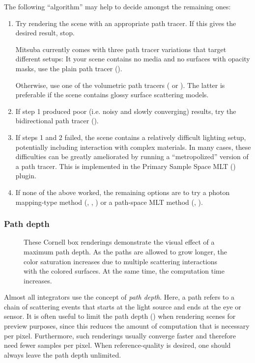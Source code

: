 The following ``algorithm'' may help to decide amongst the remaining ones:
\begin{enumerate}
\item Try rendering the scene with an appropriate path tracer. If this gives the desired result, stop.

Mitsuba currently comes with three path tracer variations that target different setups: It your
scene contains no media and no surfaces with opacity masks, use the plain path tracer ().

Otherwise, use one of the volumetric path tracers (
or ). The latter is preferable if the scene contains glossy surface scattering models.
\item If step 1 produced poor (i.e. noisy and slowly converging) results, try
the bidirectional path tracer ().
\item If steps 1 and 2 failed, the scene contains a relatively difficult lighting setup, potentially
including interaction with complex materials.
In many cases, these difficulties can be greatly ameliorated by running a ``metropolized'' version
of a path tracer. This is implemented in the Primary Sample Space MLT () plugin.
\item If none of the above worked, the remaining options are to try a photon mapping-type
method (, , ) or a path-space MLT
method (, ).
\end{enumerate}

\subsubsection*{Path depth}
\begin{figure}[htb!]
\centering
\hfill
{}
\caption{
	\label{fig:pathdepths}
	These Cornell box renderings demonstrate the visual
	effect of a maximum path depth. As the paths
	are allowed to grow longer, the color saturation
	increases due to multiple scattering interactions
	with the colored surfaces. At the same time, the
	computation time increases.
}
\end{figure}

Almost all integrators use the concept of \emph{path depth}.
Here, a path refers to a chain of scattering events that
starts at the light source and ends at the eye or sensor.
It is often useful to limit the path depth ()
when rendering scenes for preview purposes, since this reduces the amount
of computation that is necessary per pixel. Furthermore, such renderings
usually converge faster and therefore need fewer samples per pixel.
When reference-quality is desired, one should always leave the path
depth unlimited.

